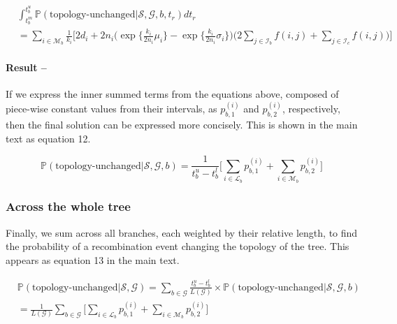 \documentclass[11pt]{article}
\begin{document}
\begin{equation}
\begin{aligned}
	&\int_{t_b^m}^{t_b^u} \mathbb{P} (\textrm{topology-unchanged} | \mathcal{S}, \mathcal{G}, b, t_r) dt_r \\
	&= \sum_{i \in \mathcal{M}_b} \frac{1}{k_i} \Bigg[ 
		2d_i + 2n_i \bigg( 
			\exp \bigg\{ \frac{k_i}{2n_i} \mu_i \bigg\} - 
			\exp \bigg\{ \frac{k_i}{2n_i} \sigma_i \bigg\}
		\bigg) 
		\bigg(2 \sum_{j \in \mathcal{I}_b} f(i,j) + \sum_{j \in \mathcal{I}_c} f(i,j) \bigg)
	\Bigg]
\end{aligned}
\end{equation}

\paragraph{Result --}
If we express the inner summed terms from the equations above, composed of piece-wise
constant values from their intervals, as $p_{b,1}^{(i)}$ and $p_{b,2}^{(i)}$, 
respectively, then the final solution can be expressed more concisely. 
This is shown in the main text as equation 12.

\begin{equation}\tag{12}
     \mathbb{P}(\text{topology-unchanged} | \mathcal{S}, \mathcal{G}, b) = 
     \frac{1}{t_b^u - t_b^l} 
     \bigg[ 
	    \sum_{i \in \mathcal{L}_b} p_{b,1}^{(i)} + 
	    \sum_{i \in \mathcal{M}_b} p_{b,2}^{(i)}
	\bigg]
\end{equation}


\subsubsection{Across the whole tree}

Finally, we sum across all branches, each weighted by their relative length, 
to find the probability of a recombination event changing the 
topology of the tree. This appears as equation 13 in the main text.

\begin{equation}\tag{13}
\begin{aligned}
    &\mathbb{P}(\text{topology-unchanged}| \mathcal{S}, \mathcal{G}) = 
    \sum_{b \in \mathcal{G}}
    \frac{t_b^u - t_b^l}
    {L(\mathcal{G})} \times \mathbb{P}(\text{topology-unchanged}| \mathcal{S}, \mathcal{G}, b) \\
    & = \frac{1}{L(\mathcal{G})} \sum_{b \in \mathcal{G}}
     \bigg[ 
	    \sum_{i \in \mathcal{L}_b} p_{b,1}^{(i)} + 
	    \sum_{i \in \mathcal{M}_b} p_{b,2}^{(i)}
	\bigg]
\end{aligned}
\end{equation}
\end{document}
